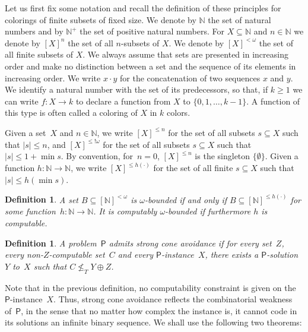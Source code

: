 \documentclass[10pt,a4paper]{article}
\newcommand{\Psf}{\mathsf{P}}
\newcommand{\NN}[0]{\mathbb{N}}
\numberwithin{theorem}{section}
\newtheorem{definition}[theorem]{Definition}
\begin{document}
Let us first fix some notation and recall the definition of these principles for colorings of finite subsets of fixed size. We denote by $\NN$ the set of natural numbers and by $\NN^+$ the set of positive natural numbers. For $X\subseteq \NN$ and $n \in \NN$
we denote by $[X]^{n}$ the set of all $n$-subsets of $X$. We denote by $[X]^{<\omega}$ the set of all finite subsets of $X$. We always assume that sets are presented in increasing order and make no distinction between a set and the sequence of its elements in increasing order. We write $x \cdot y$ for the concatenation of two sequences $x$ and $y$. We identify a natural number with the set of its predecessors, so that, if $k\geq 1$ we can write $f: X \to k$ to declare a function from $X$ to $\{0, 1, \dots, k-1\}$. A function of this type is often called a coloring of $X$ in $k$ colors.

Given a set~$X$ and $n \in \NN$, we write $[X]^{\leq n}$ for the set of all subsets $s \subseteq X$ such that $|s| \leq n$, and $[X]^{\leq !\omega}$ for the set of all subsets $s \subseteq X$ such that $|s| \leq 1+\min s$. By convention, for~$n = 0$, $[X]^{\leq n}$ is the singleton $\{\emptyset\}$. Given a function $h : \NN \to \NN$, we write $[X]^{\leq h(\cdot)}$ for the set of all finite $s \subseteq X$ such that $|s| \leq h(\min s)$. %

\begin{definition}
A set $B \subseteq [\NN]^{<\omega}$ is \emph{$\omega$-bounded} if and only if $B \subseteq [\NN]^{\leq h(\cdot)}$ for some function~$h : \NN \to \NN$. It is \emph{computably $\omega$-bounded} if furthermore $h$ is computable.
\end{definition}

\begin{definition}
A problem~$\Psf$ admits \emph{strong cone avoidance} if for every set~$Z$, every non-$Z$-computable set~$C$ and every $\Psf$-instance~$X$, there exists a $\Psf$-solution~$Y$ to~$X$ such that $C \not \leq_T Y \oplus Z$.
\end{definition}

Note that in the previous definition, no computability constraint is given on the $\Psf$-instance~$X$. Thus, strong cone avoidance reflects the combinatorial weakness of~$\Psf$, in the sense that no matter how complex the instance is, it cannot code in its solutions an infinite binary sequence. We shall use the following two theorems:
\end{document}
